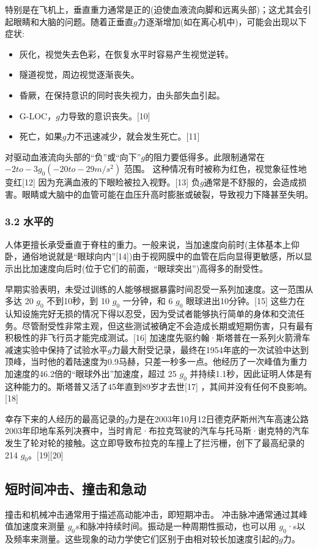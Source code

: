 特别是在飞机上，垂直重力通常是正的(迫使血液流向脚和远离头部)；这尤其会引起眼睛和大脑的问题。随着正垂直$g$力逐渐增加(如在离心机中)，可能会出现以下症状:
\begin{itemize}
\item 灰化，视觉失去色彩，在恢复水平时容易产生视觉逆转。
\item 隧道视觉，周边视觉逐渐丧失。
\item 昏厥，在保持意识的同时丧失视力，由头部失血引起。
\item G-LOC，$g$力导致的意识丧失。[10]
\item 死亡，如果$g$力不迅速减少，就会发生死亡。[11]
\end{itemize}
对驱动血液流向头部的“负”或“向下”$g$的阻力要低得多。此限制通常在 $-2 to -3 g_0 (-20 to -29 m/s^2)$ 范围。 这种情况有时被称为红色，视觉象征性地变红[12] 因为充满血液的下眼睑被拉入视野。[13] 负$g$通常是不舒服的，会造成损害。眼睛或大脑中的血管可能在血压升高时膨胀或破裂，导致视力下降甚至失明。

\subsubsection{3.2 水平的}
人体更擅长承受垂直于脊柱的重力。一般来说，当加速度向前时(主体基本上仰卧，通俗地说就是“眼球向内”[14])由于视网膜中的血管在后向显得更敏感，所以显示出比加速度向后时(位于它们的前面，“眼球突出”)高得多的耐受性。

早期实验表明，未受过训练的人能够根据暴露时间忍受一系列加速度。这一范围从多达 20 $g_0$ 不到10秒，到 10 $g_0$ 一分钟，和 6 $g_0$ 眼球进出10分钟。[15] 这些力在认知设施完好无损的情况下得以忍受，因为受试者能够执行简单的身体和交流任务。尽管耐受性非常主观，但这些测试被确定不会造成长期或短期伤害，只有最有积极性的非飞行员才能完成测试。[16] 加速度先驱约翰·斯塔普在一系列火箭滑车减速实验中保持了试验水平$g$力最大耐受记录，最终在1954年底的一次试验中达到顶峰，当时他的着陆速度为0.9马赫，只差一秒多一点。他经历了一次峰值为重力加速度的46.2倍的“眼球外出”加速度，超过 25 $g_0$ 并持续1.1秒，因此证明人体是有这种能力的。斯塔普又活了45年直到89岁才去世[17] ，其间并没有任何不良影响。[18]

幸存下来的人经历的最高记录的$g$力是在2003年10月12日德克萨斯州汽车高速公路2003年印地车系列决赛中，当时肯尼·布拉克驾驶的汽车与托马斯·谢克特的汽车发生了轮对轮的接触。这立即导致布拉克的车撞上了拦污栅，创下了最高纪录的 214 $g_0$。[19][20]

\subsection{短时间冲击、撞击和急动}
撞击和机械冲击通常用于描述高动能冲击，即短期冲击。 冲击脉冲通常通过其峰值加速度来测量 $g_0s$和脉冲持续时间。振动是一种周期性振动，也可以用 $g_0$·s以及频率来测量。这些现象的动力学使它们区别于由相对较长加速度引起的$g$力。

